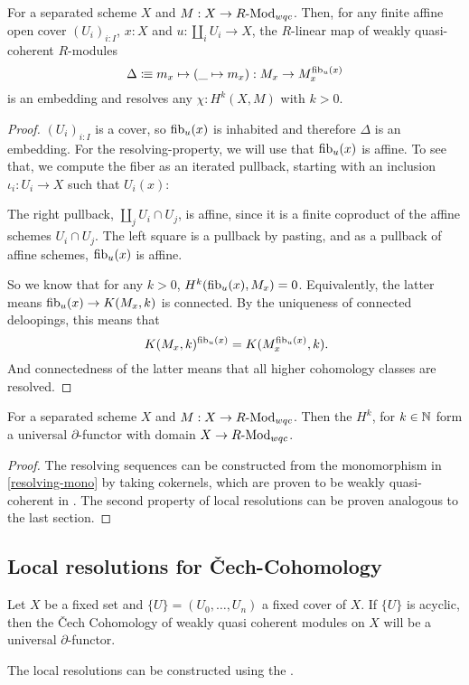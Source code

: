 \begin{remark}
  \label{resolving-mono}
  For a separated scheme $X$ and $M:X\to R\text{-}\mathrm{Mod}_{wqc}$.
  Then, for any finite affine open cover $(U_i)_{i:I}$, $x:X$
  and $u:\coprod_i U_i\to X$,
  the $R$-linear map of weakly quasi-coherent $R$-modules
  \[ \Delta\vcentcolon\mspace{-1.2mu}\equiv m_x\mapsto (\_\mapsto m_x):M_x\to M_x^{\mathrm{fib}_u(x)}\]
  is an embedding and resolves any $\chi:H^k(X,M)$ with $k>0$.
\end{remark}

\begin{proof}
  $(U_i)_{i:I}$ is a cover, so $\mathrm{fib}_u(x)$ is inhabited and therefore $\Delta$ is an embedding.
  For the resolving-property, we will use that $\mathrm{fib}_u(x)$ is affine.
  To see that,
  we compute the fiber as an iterated pullback,
  starting with an inclusion $\iota_i:U_i\to X$ such that $U_i(x)$:
  \begin{center}
  \end{center}
  The right pullback, $\coprod_j U_i\cap U_j$, is affine, since it is a finite coproduct of the affine schemes $U_i\cap U_j$.
  The left square is a pullback by pasting, and as a pullback of affine schemes, $\mathrm{fib}_u(x)$ is affine.

  So we know that for any $k>0$, $H^k(\mathrm{fib}_u(x),M_x)=0$.
  Equivalently, the latter means $\mathrm{fib}_u(x)\to K(M_x,k)$ is connected.
  By the uniqueness of connected deloopings, this means that
  \[
    K(M_x,k)^{\fib_u(x)} = K(M_x^{\fib_u(x)},k)
    \rlap{.}
  \]
  And connectedness of the latter means that all higher cohomology classes are resolved.
\end{proof}

\begin{theorem}
  For a separated scheme $X$ and $M:X\to R\text{-}\mathrm{Mod}_{wqc}$.
  Then the $H^k$, for $k\in\mathbb{N}$ form a universal $\partial$-functor with domain $X\to R\text{-}\mathrm{Mod}_{wqc}$.
\end{theorem}

\begin{proof}
  The resolving sequences can be constructed from the monomorphism in \cref{resolving-mono}
  by taking cokernels, which are proven to be weakly quasi-coherent in \cite{draft}.
  The second property of local resolutions can be proven analogous to the last section.
\end{proof}

\subsection{Local resolutions for \v{C}ech-Cohomology}

Let $X$ be a fixed set and $\{U\}=(U_0,\dots,U_n)$ a fixed cover of $X$.
If $\{U\}$ is acyclic, then the \v{C}ech Cohomology of weakly quasi coherent modules on $X$
will be a universal $\partial$-functor.

The local resolutions can be constructed using the .